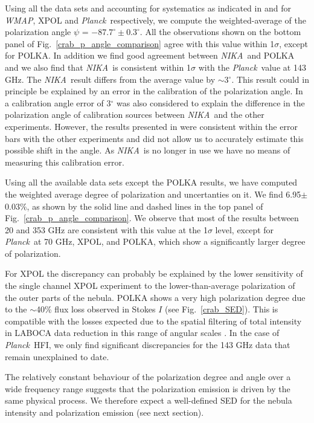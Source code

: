 \documentclass[twocolumn,traditabstract]{aa}
\def\NIKA{\textit{NIKA}}
\def\Planck{\textit{Planck}}
\def\WMAP{\textit{WMAP}}
\begin{document}
Using all the data sets and accounting for systematics as indicated in \citet{2011ApJS..192...19W,thum2008} and \citet{rosset2010} for \WMAP, XPOL and \Planck\ respectively,  we compute the weighted-average of the polarization angle $\psi$ = $-87.7^{\circ}\pm 0.3^{\circ}$.  
All the observations shown on the bottom panel of
Fig.~\ref{crab_p_angle_comparison} agree with this value within 1$\sigma$,  except for POLKA.
In addition we find  good agreement between  \NIKA\ and POLKA and we also find that \NIKA\ is consistent within 1$\sigma$ with the \Planck\ value at 143 GHz. The \NIKA\ result differs from the average value by $\sim$3$^{\circ}$.  This result could in principle be explained by an error in the calibration of the polarization angle.
In \cite{ritacco2017} a calibration angle error of 3$^{\circ}$ was also considered to explain the difference  in the polarization angle of calibration sources between \NIKA\ and the other experiments. However, the results presented in \cite{ritacco2017} were consistent within the error bars with the other experiments
and did not allow us to accurately estimate this possible shift in the angle. 
As  \NIKA\ is no longer in use we have no means of measuring this calibration error.
  
Using all the available data sets except the POLKA results, we have computed the weighted average degree of polarization and uncertanties on it.
We find 6.95$\pm$0.03$\%$, as shown by the solid line and dashed lines in the top panel of Fig.~\ref{crab_p_angle_comparison}. We observe that most of the results between 20 and 353 GHz are consistent with this value at the 1$\sigma$ level, except for \Planck\ at 70 GHz, XPOL, and POLKA,  which show a significantly larger degree of polarization.

For XPOL the discrepancy can
probably be explained by the lower sensitivity of the single channel XPOL experiment to the lower-than-average polarization of the outer parts of the
nebula.
POLKA shows a very high polarization degree due to the $\sim$40\% flux loss observed in Stokes $I$ (see Fig.~\ref{crab_SED}). This is compatible with the losses expected due to the spatial filtering of total intensity in LABOCA data reduction in this range of angular scales \citep{2011A&A...527A.145B}.
In the case of \Planck\ HFI, we only find significant discrepancies for the 143 GHz data that remain unexplained to date.

The relatively constant behaviour of the polarization degree and angle over a wide frequency range suggests that the polarization emission is driven by the same physical process. We therefore expect a well-defined SED for the  nebula intensity and polarization emission (see next section).
\end{document}
